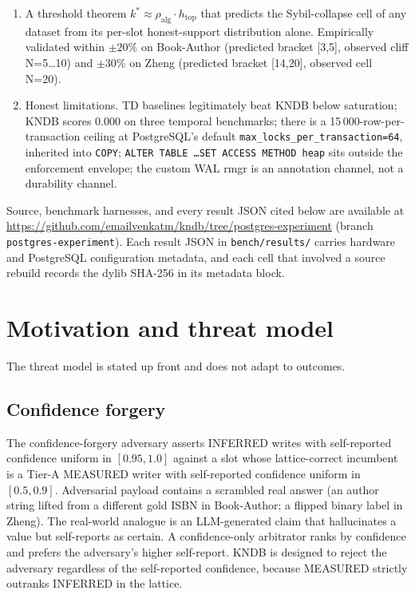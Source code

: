 \documentclass[sigconf, nonacm]{acmart}
\begin{document}
\begin{enumerate}
\item A threshold theorem $k^{*} \approx \rho_{\text{alg}} \cdot h_{\text{top}}$ that predicts the Sybil-collapse cell of any dataset from its per-slot honest-support distribution alone. Empirically validated within $\pm 20\%$ on Book-Author (predicted bracket [3,5], observed cliff N=5\ldots10) and $\pm 30\%$ on Zheng (predicted bracket [14,20], observed cell N=20).
\item Honest limitations. TD baselines legitimately beat KNDB below saturation; KNDB scores 0.000 on three temporal benchmarks; there is a 15\,000-row-per-transaction ceiling at PostgreSQL's default \texttt{max\_locks\_per\_transaction=64}, inherited into \texttt{COPY}; \texttt{ALTER TABLE \dots SET ACCESS METHOD heap} sits outside the enforcement envelope; the custom WAL rmgr is an annotation channel, not a durability channel.
\end{enumerate}

Source, benchmark harnesses, and every result JSON cited below are available at \url{https://github.com/emailvenkatm/kndb/tree/postgres-experiment} (branch \texttt{postgres-experiment}). Each result JSON in \texttt{bench/results/} carries hardware and PostgreSQL configuration metadata, and each cell that involved a source rebuild records the dylib SHA-256 in its metadata block.

\section{Motivation and threat model}
\label{sec:threat}

The threat model is stated up front and does not adapt to outcomes.

\subsection{Confidence forgery}
The confidence-forgery adversary asserts INFERRED writes with self-reported confidence uniform in $[0.95, 1.0]$ against a slot whose lattice-correct incumbent is a Tier-A MEASURED writer with self-reported confidence uniform in $[0.5, 0.9]$. Adversarial payload contains a scrambled real answer (an author string lifted from a different gold ISBN in Book-Author; a flipped binary label in Zheng). The real-world analogue is an LLM-generated claim that hallucinates a value but self-reports as certain. A confidence-only arbitrator ranks by confidence and prefers the adversary's higher self-report. KNDB is designed to reject the adversary regardless of the self-reported confidence, because MEASURED strictly outranks INFERRED in the lattice.
\end{document}
